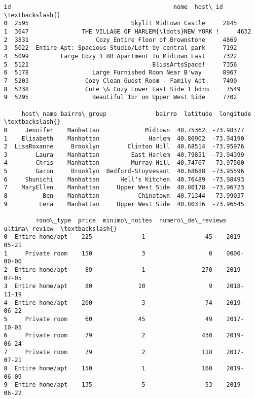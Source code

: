 \documentclass[11pt]{article}
\makeatletter
\newcommand{\boxspacing}{\kern\kvtcb@left@rule\kern\kvtcb@boxsep}
\newcommand{\prompt}[4]{
        {\ttfamily\llap{{\color{#2}[#3]:\hspace{3pt}#4}}\vspace{-\baselineskip}}
    }
\makeatother
\begin{document}
            \begin{tcolorbox}[breakable, size=fbox, boxrule=.5pt, pad at break*=1mm, opacityfill=0]
\prompt{Out}{outcolor}{228}{\boxspacing}
\begin{Verbatim}[commandchars=\\\{\}]
     id                                              nome  host\_id  \textbackslash{}
0  2595                             Skylit Midtown Castle     2845
1  3647               THE VILLAGE OF HARLEM{\ldots}NEW YORK !     4632
2  3831                   Cozy Entire Floor of Brownstone     4869
3  5022  Entire Apt: Spacious Studio/Loft by central park     7192
4  5099         Large Cozy 1 BR Apartment In Midtown East     7322
5  5121                                   BlissArtsSpace!     7356
6  5178                  Large Furnished Room Near B'way      8967
7  5203                Cozy Clean Guest Room - Family Apt     7490
8  5238                Cute \& Cozy Lower East Side 1 bdrm     7549
9  5295                  Beautiful 1br on Upper West Side     7702

     host\_name bairro\_group              bairro  latitude  longitude  \textbackslash{}
0     Jennifer    Manhattan             Midtown  40.75362  -73.98377
1    Elisabeth    Manhattan              Harlem  40.80902  -73.94190
2  LisaRoxanne     Brooklyn        Clinton Hill  40.68514  -73.95976
3        Laura    Manhattan         East Harlem  40.79851  -73.94399
4        Chris    Manhattan         Murray Hill  40.74767  -73.97500
5        Garon     Brooklyn  Bedford-Stuyvesant  40.68688  -73.95596
6     Shunichi    Manhattan      Hell's Kitchen  40.76489  -73.98493
7    MaryEllen    Manhattan     Upper West Side  40.80178  -73.96723
8          Ben    Manhattan           Chinatown  40.71344  -73.99037
9         Lena    Manhattan     Upper West Side  40.80316  -73.96545

         room\_type  price  minimo\_noites  numero\_de\_reviews ultima\_review  \textbackslash{}
0  Entire home/apt    225              1                 45    2019-05-21
1     Private room    150              3                  0    0000-00-00
2  Entire home/apt     89              1                270    2019-07-05
3  Entire home/apt     80             10                  9    2018-11-19
4  Entire home/apt    200              3                 74    2019-06-22
5     Private room     60             45                 49    2017-10-05
6     Private room     79              2                430    2019-06-24
7     Private room     79              2                118    2017-07-21
8  Entire home/apt    150              1                160    2019-06-09
9  Entire home/apt    135              5                 53    2019-06-22


\end{Verbatim}
\end{tcolorbox}
\end{document}
